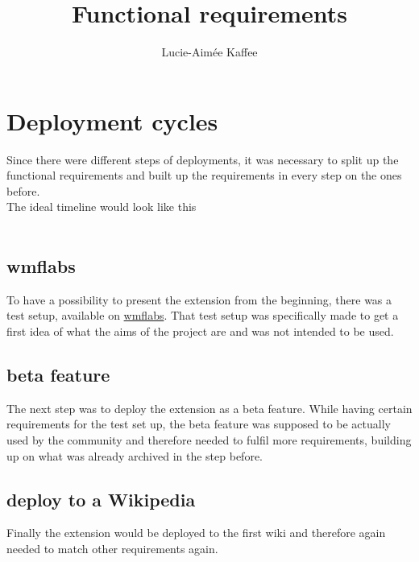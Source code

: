 \documentclass[11pt]{article}
\title {{Functional requirements}}
\author {Lucie-Aim\'{e}e Kaffee}
\date{}
\begin{document}
\section{Deployment cycles}
Since there were different steps of deployments, it was necessary to split up the functional requirements and built up the requirements in every step on the ones before. \\
The ideal timeline would look like this
\\ 
\\

\subsection{wmflabs}
To have a possibility to present the extension from the beginning, there was a test setup, available on \href{articleplaceholder.wmflabs.org/mediawiki}{wmflabs}. That test setup was specifically made to get a first idea of what the aims of the project are and was not intended to be used. 

\subsection{beta feature}
The next step was to deploy the extension as a beta feature. While having certain requirements for the test set up, the beta feature was supposed to be actually used by the community and therefore needed to fulfil more requirements, building up on what was already archived in the step before. 

\subsection{deploy to a Wikipedia}
Finally the extension would be deployed to the first wiki and therefore again needed to match other requirements again. 


 
\end{document}
